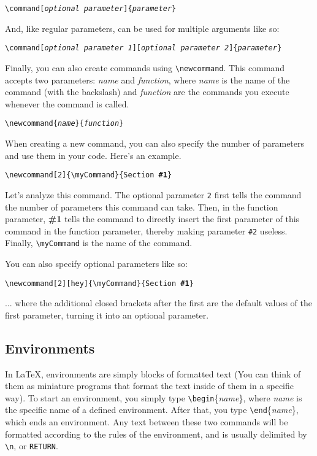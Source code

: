 \begin{center}
\texttt{\textbackslash command[\textit{optional parameter}]\{\textit{parameter}\}}
\end{center}

And, like regular parameters, can be used for multiple arguments like so:
 
\begin{center}
\texttt{\textbackslash command[\textit{optional parameter 1}][\textit{optional parameter 2}]\{\textit{parameter}\}}
\end{center}

Finally, you can also create commands using \texttt{\textbackslash newcommand}. This command accepts two parameters: \textit{name} and \textit{function}, where \textit{name} is the name of the command (with the backslash) and \textit{function} are the commands you execute whenever the command is called. 

\begin{center}
\texttt{\textbackslash newcommand\{\textit{name}\}\{\textit{function}\}}
\end{center}

When creating a new command, you can also specify the number of parameters and use them in your code. Here's an example. 

\begin{center}
\texttt{\textbackslash newcommand[2]\{\textbackslash myCommand\}\{Section \textbf{\#1}\}}
\end{center}

Let's analyze this command. The optional parameter \texttt{2} first tells the command the number of parameters this command can take. Then, in the function parameter, \textbf{\#1} tells the command to directly insert the first parameter of this command in the function parameter, thereby making parameter \texttt{\#2} useless. Finally, \texttt{\textbackslash myCommand} is the name of the command. 

You can also specify optional parameters like so: 
\begin{center}
\texttt{\textbackslash newcommand[2][hey]\{\textbackslash myCommand\}\{Section \textbf{\#1}\}}
\end{center}

... where the additional closed brackets after the first are the default values of the first parameter, turning it into an optional parameter. 




\subsection{Environments}
In \LaTeX, environments are simply blocks of formatted text (You can think of them as miniature programs that format the text inside of them in a specific way). To start an environment, you simply type \texttt{\textbackslash begin}\{\textit{name}\}, where \textit{name} is the specific name of a defined environment. After that, you type \texttt{\textbackslash end}\{\textit{name}\}, which ends an environment. Any text between these two commands will be formatted according to the rules of the environment, and is usually delimited by \texttt{\textbackslash n}, or \texttt{RETURN}. 

